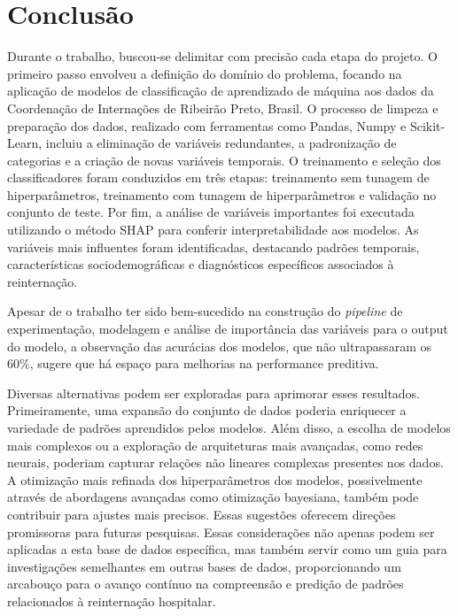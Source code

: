 \chapter{Conclusão}

Durante o trabalho, buscou-se delimitar com precisão cada etapa do projeto. O primeiro passo envolveu a definição do domínio do problema, focando na aplicação de modelos de classificação de aprendizado de máquina aos dados da Coordenação de Internações de Ribeirão Preto, Brasil. O processo de limpeza e preparação dos dados, realizado com ferramentas como Pandas, Numpy e Scikit-Learn, incluiu a eliminação de variáveis redundantes, a padronização de categorias e a criação de novas variáveis temporais. O treinamento e seleção dos classificadores foram conduzidos em três etapas: treinamento sem tunagem de hiperparâmetros, treinamento com tunagem de hiperparâmetros e validação no conjunto de teste. Por fim, a análise de variáveis importantes foi executada utilizando o método SHAP para conferir interpretabilidade aos modelos. As variáveis mais influentes foram identificadas, destacando padrões temporais, características sociodemográficas e diagnósticos específicos associados à reinternação.

Apesar de o trabalho ter sido bem-sucedido na construção do \textit{pipeline} de experimentação, modelagem e análise de importância das variáveis para o output do modelo, a observação das acurácias dos modelos, que não ultrapassaram os 60\%, sugere que há espaço para melhorias na performance preditiva.

Diversas alternativas podem ser exploradas para aprimorar esses resultados. Primeiramente, uma expansão do conjunto de dados poderia enriquecer a variedade de padrões aprendidos pelos modelos. Além disso, a escolha de modelos mais complexos ou a exploração de arquiteturas mais avançadas, como redes neurais, poderiam capturar relações não lineares complexas presentes nos dados. A otimização mais refinada dos hiperparâmetros dos modelos, possivelmente através de abordagens avançadas como otimização bayesiana, também pode contribuir para ajustes mais precisos. Essas sugestões oferecem direções promissoras para futuras pesquisas. Essas considerações não apenas podem ser aplicadas a esta base de dados específica, mas também servir como um guia para investigações semelhantes em outras bases de dados, proporcionando um arcabouço para o avanço contínuo na compreensão e predição de padrões relacionados à reinternação hospitalar.